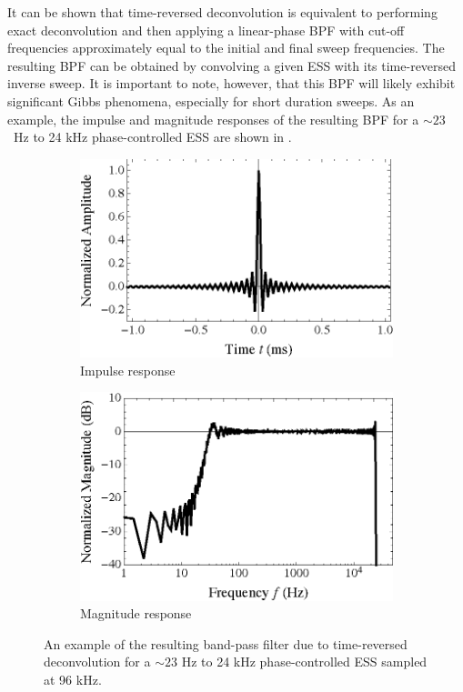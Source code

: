 It can be shown that time-reversed deconvolution is equivalent to performing exact deconvolution and then applying a linear-phase BPF with cut-off frequencies approximately equal to the initial and final sweep frequencies.
The resulting BPF can be obtained by convolving a given ESS with its time-reversed inverse sweep.
It is important to note, however, that this BPF will likely exhibit significant Gibbs phenomena, especially for short duration sweeps.
As an example, the impulse and magnitude responses of the resulting BPF for a $\sim23$~Hz to 24 kHz phase-controlled ESS are shown in .

\begin{figure}[t]
    \centering
    \begin{subfigure}[b]{0.49\textwidth}
        \includegraphics[width = \columnwidth]{A5_impulse_response/figures/Farina_Inverse_BPF_IR_Sm}
        \caption{Impulse response}
    \end{subfigure}
    \hfill
    \begin{subfigure}[b]{0.482\textwidth}
        \includegraphics[width = \columnwidth]{A5_impulse_response/figures/Farina_Inverse_BPF_FR_Sm}
        \caption{Magnitude response}
    \end{subfigure}
\caption[Band-pass filter due to time-reversed deconvolution.]{
An example of the resulting band-pass filter due to time-reversed deconvolution for a $\sim23$ Hz to 24 kHz phase-controlled ESS sampled at 96 kHz.}
\label{fig:farina_BPF}
\end{figure}

